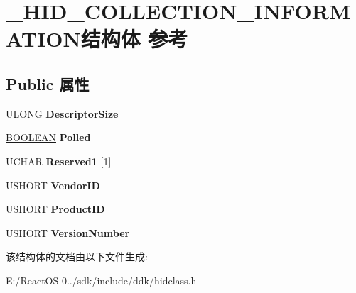 \hypertarget{struct___h_i_d___c_o_l_l_e_c_t_i_o_n___i_n_f_o_r_m_a_t_i_o_n}{}\section{\+\_\+\+H\+I\+D\+\_\+\+C\+O\+L\+L\+E\+C\+T\+I\+O\+N\+\_\+\+I\+N\+F\+O\+R\+M\+A\+T\+I\+O\+N结构体 参考}
\label{struct___h_i_d___c_o_l_l_e_c_t_i_o_n___i_n_f_o_r_m_a_t_i_o_n}
\subsection*{Public 属性}
\begin{DoxyCompactItemize}
\item 
\mbox{\label{struct___h_i_d___c_o_l_l_e_c_t_i_o_n___i_n_f_o_r_m_a_t_i_o_n_ab5406841fe8b8b6bc798b502401b1205}} 
U\+L\+O\+NG {\bfseries Descriptor\+Size}
\item 
\mbox{\label{struct___h_i_d___c_o_l_l_e_c_t_i_o_n___i_n_f_o_r_m_a_t_i_o_n_abe1648073afe5b2553b169ed21575e7f}} 
\hyperlink{_processor_bind_8h_a112e3146cb38b6ee95e64d85842e380a}{B\+O\+O\+L\+E\+AN} {\bfseries Polled}
\item 
\mbox{\label{struct___h_i_d___c_o_l_l_e_c_t_i_o_n___i_n_f_o_r_m_a_t_i_o_n_ae1b5a7f9ed1c5814e68cbfde0f308968}} 
U\+C\+H\+AR {\bfseries Reserved1} \mbox{[}1\mbox{]}
\item 
\mbox{\label{struct___h_i_d___c_o_l_l_e_c_t_i_o_n___i_n_f_o_r_m_a_t_i_o_n_a46227c83ba94246e8008babc2ab8c6d9}} 
U\+S\+H\+O\+RT {\bfseries Vendor\+ID}
\item 
\mbox{\label{struct___h_i_d___c_o_l_l_e_c_t_i_o_n___i_n_f_o_r_m_a_t_i_o_n_adcb5b290cd1750b87a2c8144728a458b}} 
U\+S\+H\+O\+RT {\bfseries Product\+ID}
\item 
\mbox{\label{struct___h_i_d___c_o_l_l_e_c_t_i_o_n___i_n_f_o_r_m_a_t_i_o_n_aa6d7d851886377c8030591e7e843807e}} 
U\+S\+H\+O\+RT {\bfseries Version\+Number}
\end{DoxyCompactItemize}


该结构体的文档由以下文件生成\+:\begin{DoxyCompactItemize}
\item 
E\+:/\+React\+O\+S-\/0../sdk/include/ddk/hidclass.\+h\end{DoxyCompactItemize}
